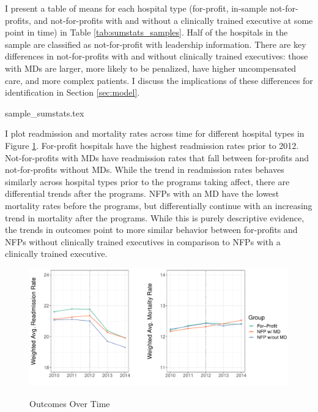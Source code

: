 \documentclass[12pt]{article}
\begin{document}


    I present a table of means for each hospital type (for-profit, in-sample not-for-profits, and not-for-profits with and without a clinically trained executive at some point in time) in Table \ref{tab:sumstats_samples}. Half of the hospitals in the sample are classified as not-for-profit with leadership information. There are key differences in not-for-profits with and without clinically trained executives: those with MDs are larger, more likely to be penalized, have higher uncompensated care, and more complex patients. I discuss the implications of these differences for identification in Section \ref{sec:model}. 

    {sample_sumstats.tex}

    I plot readmission and mortality rates across time for different hospital types in Figure \ref{fig:weighted_read_mort_graph}. For-profit hospitals have the highest readmission rates prior to 2012. Not-for-profits with MDs have readmission rates that fall between for-profits and not-for-profits without MDs. While the trend in readmission rates behaves similarly across hospital types prior to the programs taking affect, there are differential trends after the programs. NFPs with an MD have the lowest mortality rates before the programs, but differentially continue with an increasing trend in mortality after the programs. While this is purely descriptive evidence, the trends in outcomes point to more similar behavior between for-profits and NFPs without clinically trained executives in comparison to NFPs with a clinically trained executive.

    \begin{figure}[ht!]
    \centering
        \caption{Outcomes Over Time}
        \includegraphics[width=\textwidth]{Objects/weighted_read_mort_graph.pdf}
        \label{fig:weighted_read_mort_graph}
    \end{figure}
\end{document}
